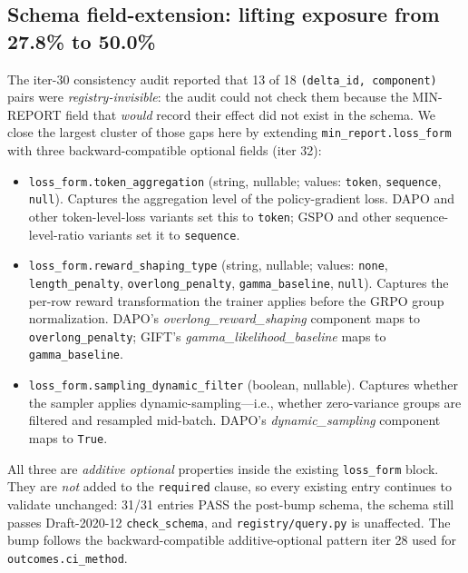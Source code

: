 \subsection{Schema field-extension: lifting exposure from 27.8\% to 50.0\%}
\label{sec:p6-schema-extension}

The iter-30 consistency audit reported that 13 of 18
\texttt{(delta\_id, component)} pairs were \emph{registry-invisible}:
the audit could not check them because the MIN-REPORT field that
\emph{would} record their effect did not exist in the schema. We close
the largest cluster of those gaps here by extending
\texttt{min\_report.loss\_form} with three backward-compatible optional
fields (iter 32):

\begin{itemize}
  \item \texttt{loss\_form.token\_aggregation} (string, nullable;
    values: \texttt{token}, \texttt{sequence}, \texttt{null}). Captures
    the aggregation level of the policy-gradient loss. DAPO and other
    token-level-loss variants set this to \texttt{token}; GSPO and
    other sequence-level-ratio variants set it to \texttt{sequence}.
  \item \texttt{loss\_form.reward\_shaping\_type} (string, nullable;
    values: \texttt{none}, \texttt{length\_penalty},
    \texttt{overlong\_penalty}, \texttt{gamma\_baseline}, \texttt{null}).
    Captures the per-row reward transformation the trainer applies
    before the GRPO group normalization. DAPO's
    \emph{overlong\_reward\_shaping} component maps to
    \texttt{overlong\_penalty}; GIFT's \emph{gamma\_likelihood\_baseline}
    maps to \texttt{gamma\_baseline}.
  \item \texttt{loss\_form.sampling\_dynamic\_filter} (boolean,
    nullable). Captures whether the sampler applies
    dynamic-sampling---i.e., whether zero-variance groups are filtered
    and resampled mid-batch. DAPO's \emph{dynamic\_sampling} component
    maps to \texttt{True}.
\end{itemize}

All three are \emph{additive optional} properties inside the existing
\texttt{loss\_form} block. They are \emph{not} added to the
\texttt{required} clause, so every existing entry continues to
validate unchanged: 31/31 entries PASS the post-bump schema, the
schema still passes Draft-2020-12 \texttt{check\_schema}, and
\texttt{registry/query.py} is unaffected. The bump follows the
backward-compatible additive-optional pattern iter 28 used for
\texttt{outcomes.ci\_method}.

